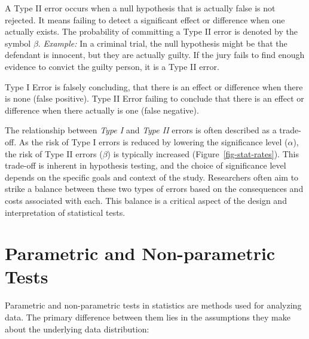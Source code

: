 \documentclass[
  a4paper,
]{scrbook}
\begin{document}
A Type II error occurs when a null hypothesis that is actually false is
not rejected. It means failing to detect a significant effect or
difference when one actually exists. The probability of committing a
Type II error is denoted by the symbol \(\beta\). \emph{Example:} In a
criminal trial, the null hypothesis might be that the defendant is
innocent, but they are actually guilty. If the jury fails to find enough
evidence to convict the guilty person, it is a Type II error.

Type I Error is falsely concluding, that there is an effect or
difference when there is none (false positive). Type II Error failing to
conclude that there is an effect or difference when there actually is
one (false negative).

The relationship between \emph{Type I} and \emph{Type II} errors is
often described as a trade-off. As the risk of Type I errors is reduced
by lowering the significance level (\(\alpha\)), the risk of Type II
errors (\(\beta\)) is typically increased (Figure~\ref{fig-stat-rates}).
This trade-off is inherent in hypothesis testing, and the choice of
significance level depends on the specific goals and context of the
study. Researchers often aim to strike a balance between these two types
of errors based on the consequences and costs associated with each. This
balance is a critical aspect of the design and interpretation of
statistical tests.

\newpage{}

\section{Parametric and Non-parametric
Tests}\label{parametric-and-non-parametric-tests}

Parametric and non-parametric tests in statistics are methods used for
analyzing data. The primary difference between them lies in the
assumptions they make about the underlying data distribution:
\end{document}
